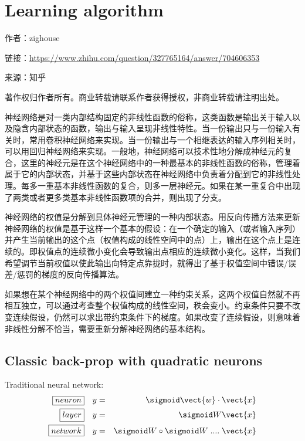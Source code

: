 \section{Learning algorithm}

作者：zighouse

链接：\url{https://www.zhihu.com/question/327765164/answer/704606353}

来源：知乎

著作权归作者所有。商业转载请联系作者获得授权，非商业转载请注明出处。

神经网络是对一类内部结构固定的非线性函数的俗称，这类函数是输出关于输入以及隐含内部状态的函数，输出与输入呈现非线性特性。当一份输出只与一份输入有关时，常用卷积神经网络来实现。当一份输出与一个相继表达的输入序列相关时，可以用回归神经网络来实现。一般地，神经网络可以技术性地分解成神经元的复合，这里的神经元是在这个神经网络中的一种最基本的非线性函数的俗称，管理着属于它的内部状态，并基于这些内部状态在神经网络中负责着分配到它的非线性处理。每多一重基本非线性函数的复合，则多一层神经元。如果在某一重复合中出现了两类或者更多类基本非线性函数项的合并，则出现了分支。

神经网络的权值是分解到具体神经元管理的一种内部状态。用反向传播方法来更新神经网络的权值是基于这样一个基本的假设：在一个确定的输入（或者输入序列）并产生当前输出的这个点（权值构成的线性空间中的点）上，输出在这个点上是连续的。即权值点的连续微小变化会导致输出点相应的连续微小变化。这样，当我们希望调节当前权值以使此输出向特定点靠拢时，就得出了基于权值空间中错误/误差/惩罚的梯度的反向传播算法。

如果想在某个神经网络中的两个权值间建立一种约束关系，这两个权值自然就不再相互独立，可以通过考查整个权值构成的线性空间，秩会变小。约束条件只要不改变连续假设，仍然可以求出带约束条件下的梯度。如果改变了连续假设，则意味着非线性分解不恰当，需要重新分解神经网络的基本结构。

\subsection{Classic back-prop with quadratic neurons}

Traditional neural network:
\begin{eqnarray}
\boxed{neuron} \quad & y = & \sigmoid \vect{w} \cdot \vect{x} \nonumber \\
\boxed{layer} \quad & y = & \sigmoid W \vect{x} \nonumber \\
\boxed{network} \quad & y = & \sigmoid W \circ \sigmoid W \; .... \; \vect{x} 
\end{eqnarray}

